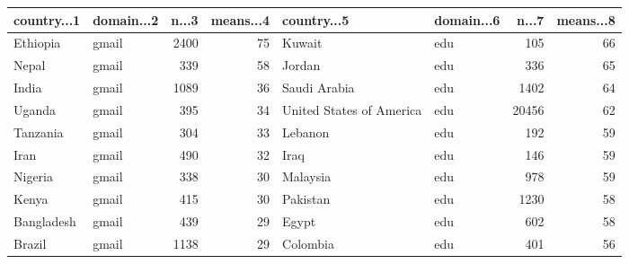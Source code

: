 \begin{table}[ht]
\centering
\begin{tabular}{llrrllrr}
 country...1 & domain...2 & n...3 & means...4 & country...5 & domain...6 & n...7 & means...8 \\ 
  \hline
Ethiopia & gmail & 2400 & 75 & Kuwait & edu & 105 & 66 \\ 
  Nepal & gmail & 339 & 58 & Jordan & edu & 336 & 65 \\ 
  India & gmail & 1089 & 36 & Saudi Arabia & edu & 1402 & 64 \\ 
  Uganda & gmail & 395 & 34 & United States of America & edu & 20456 & 62 \\ 
  Tanzania & gmail & 304 & 33 & Lebanon & edu & 192 & 59 \\ 
  Iran & gmail & 490 & 32 & Iraq & edu & 146 & 59 \\ 
  Nigeria & gmail & 338 & 30 & Malaysia & edu & 978 & 59 \\ 
  Kenya & gmail & 415 & 30 & Pakistan & edu & 1230 & 58 \\ 
  Bangladesh & gmail & 439 & 29 & Egypt & edu & 602 & 58 \\ 
  Brazil & gmail & 1138 & 29 & Colombia & edu & 401 & 56 \\ 
  \end{tabular}
\end{table}
